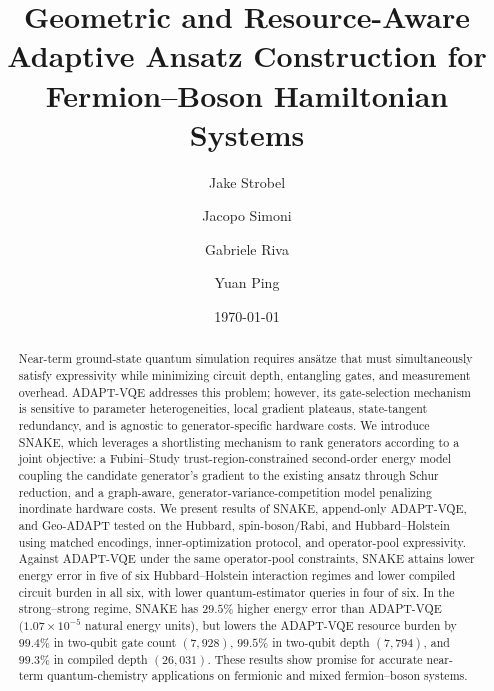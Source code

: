 \documentclass[
  reprint,
  amsmath,
  amssymb,
  aps,
  pra,
  nofootinbib,
  superscriptaddress,
  floatfix
]{revtex4-2}
\begin{document}
\makeatletter
\def\bibsection{\section*{\refname}\@nobreaktrue}
\makeatother

\title{Geometric and Resource-Aware Adaptive Ansatz Construction for Fermion--Boson Hamiltonian Systems}

\author{Jake Strobel}
\author{Jacopo Simoni}
\author{Gabriele Riva}
\author{Yuan Ping}

\date{\today}

\begin{abstract}
Near-term ground-state quantum simulation requires ansätze that must simultaneously satisfy expressivity while minimizing circuit depth, entangling gates, and measurement overhead. ADAPT-VQE addresses this problem; however, its gate-selection mechanism is sensitive to parameter heterogeneities, local gradient plateaus, state-tangent redundancy, and is agnostic to generator-specific hardware costs. We introduce SNAKE, which leverages a shortlisting mechanism to rank generators according to a joint objective: a Fubini--Study trust-region-constrained second-order energy model coupling the candidate generator's gradient to the existing ansatz through Schur reduction, and a graph-aware, generator-variance-competition model penalizing inordinate hardware costs. We present results of SNAKE, append-only ADAPT-VQE, and Geo-ADAPT tested on the Hubbard, spin-boson/Rabi, and Hubbard--Holstein using matched encodings, inner-optimization protocol, and operator-pool expressivity. Against ADAPT-VQE under the same operator-pool constraints, SNAKE attains lower energy error in five of six Hubbard--Holstein interaction regimes and lower compiled circuit burden in all six, with lower quantum-estimator queries in four of six. In the strong--strong regime, SNAKE has \(29.5\%\) higher energy error than ADAPT-VQE \((1.07\times10^{-5}\) natural energy units), but lowers the ADAPT-VQE resource burden by \(99.4\%\) in two-qubit gate count \((7{,}928)\), \(99.5\%\) in two-qubit depth \((7{,}794)\), and \(99.3\%\) in compiled depth \((26{,}031)\). These results show promise for accurate near-term quantum-chemistry applications on fermionic and mixed fermion--boson systems.


\end{abstract}

\maketitle
\end{document}
